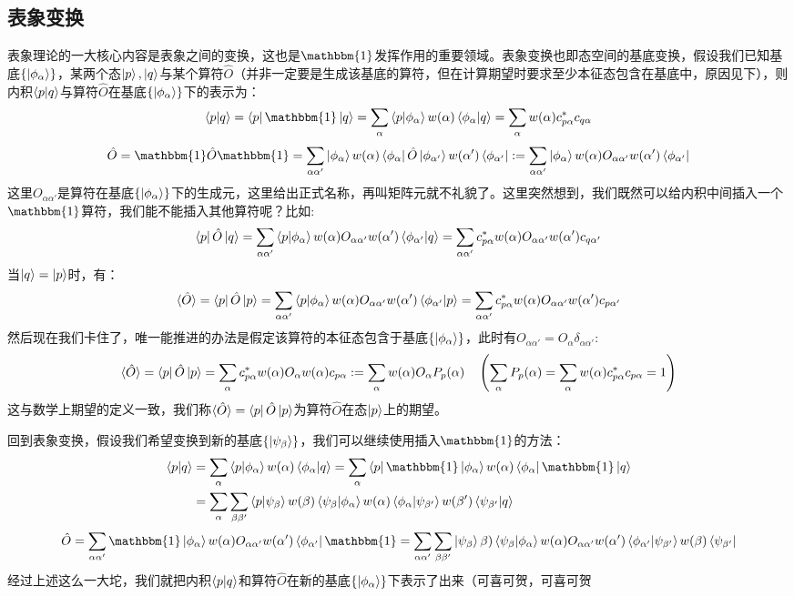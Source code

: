 \subsection{表象变换}
表象理论的一大核心内容是表象之间的变换，这也是$\mathbbm{1}$发挥作用的重要领域。表象变换也即态空间的基底变换，假设我们已知基底$\{\ket{\phi_{\alpha}}\}$，某两个态$\ket{p},\ket{q}$与某个算符$\hat{O}$（并非一定要是生成该基底的算符，但在计算期望时要求至少本征态包含在基底中，原因见下），则内积$\bra{p}\ket{q}$与算符$\hat{O}$在基底$\{\ket{\phi_{\alpha}}\}$下的表示为：
\[\bra{p}\ket{q}=\bra{p}\mathbbm{1}\ket{q}=\sum_{\alpha}\bra{p}\ket{\phi_{\alpha}}w(\alpha)\bra{\phi_{\alpha}}\ket{q}=\sum_{\alpha}w(\alpha)c_{p\alpha}^*c_{q\alpha}\]
\[\hat{O}=\mathbbm{1}\hat{O}\mathbbm{1}=\sum_{\alpha\alpha'}\ket{\phi_{\alpha}}w(\alpha)\bra{\phi_{\alpha}}\hat{O}\ket{\phi_{\alpha'}}w(\alpha')\bra{\phi_{\alpha'}}:=\sum_{\alpha\alpha'}\ket{\phi_{\alpha}}w(\alpha)O_{\alpha\alpha'}w(\alpha')\bra{\phi_{\alpha'}}\]
这里$O_{\alpha\alpha'}$是算符在基底$\{\ket{\phi_{\alpha}}\}$下的生成元，这里给出正式名称，再叫矩阵元就不礼貌了。这里突然想到，我们既然可以给内积中间插入一个$\mathbbm{1}$算符，我们能不能插入其他算符呢？比如:
\[\bra{p}\hat{O}\ket{q}=\sum_{\alpha\alpha'}\bra{p}\ket{\phi_{\alpha}}w(\alpha)O_{\alpha\alpha'}w(\alpha')\bra{\phi_{\alpha'}}\ket{q}=\sum_{\alpha\alpha'}c_{p\alpha}^*w(\alpha)O_{\alpha\alpha'}w(\alpha')c_{q\alpha'}\]
当$\ket{q}=\ket{p}$时，有：
\[\langle\hat{O}\rangle=\bra{p}\hat{O}\ket{p}=\sum_{\alpha\alpha'}\bra{p}\ket{\phi_{\alpha}}w(\alpha)O_{\alpha\alpha'}w(\alpha')\bra{\phi_{\alpha'}}\ket{p}=\sum_{\alpha\alpha'}c_{p\alpha}^*w(\alpha)O_{\alpha\alpha'}w(\alpha')c_{p\alpha'}\]
然后现在我们卡住了，唯一能推进的办法是假定该算符的本征态包含于基底$\{\ket{\phi_{\alpha}}\}$，此时有$O_{\alpha\alpha'}=O_{\alpha}\delta_{\alpha\alpha'}$:
\[\langle\hat{O}\rangle=\bra{p}\hat{O}\ket{p}=\sum_{\alpha}c_{p\alpha}^*w(\alpha)O_{\alpha}w(\alpha)c_{p\alpha}:=\sum_{\alpha}w(\alpha)O_{\alpha}P_p(\alpha) \quad \left(\sum_{\alpha}P_p(\alpha)=\sum_{\alpha}w(\alpha)c_{p\alpha}^*c_{p\alpha}=1\right)\]
这与数学上期望的定义一致，我们称$\langle\hat{O}\rangle=\bra{p}\hat{O}\ket{p}$为算符$\hat{O}$在态$\ket{p}$上的期望。

回到表象变换，假设我们希望变换到新的基底$\{\ket{\psi_{\beta}}\}$，我们可以继续使用插入$\mathbbm{1}$的方法：
\[\begin{aligned}
\bra{p}\ket{q}&=\sum_{\alpha}\bra{p}\ket{\phi_{\alpha}}w(\alpha)\bra{\phi_{\alpha}}\ket{q}=\sum_{\alpha}\bra{p}\mathbbm{1}\ket{\phi_{\alpha}}w(\alpha)\bra{\phi_{\alpha}}\mathbbm{1}\ket{q}\\
&=\sum_{\alpha}\sum_{\beta\beta'}\bra{p}\ket{\psi_{\beta}}w(\beta)\bra{\psi_{\beta}}\ket{\phi_{\alpha}}w(\alpha)\bra{\phi_{\alpha}}\ket{\psi_{\beta'}}w(\beta')\bra{\psi_{\beta'}}\ket{q}
\end{aligned}\]
\[\hat{O}=\sum_{\alpha\alpha'}\mathbbm{1}\ket{\phi_{\alpha}}w(\alpha)O_{\alpha\alpha'}w(\alpha')\bra{\phi_{\alpha'}}\mathbbm{1}=\sum_{\alpha\alpha'}\sum_{\beta\beta'}\ket{\psi_{\beta}}\beta)\bra{\psi_{\beta}}\ket{\phi_{\alpha}}w(\alpha)O_{\alpha\alpha'}w(\alpha')\bra{\phi_{\alpha'}}\ket{\psi_{\beta'}}w(\beta)\bra{\psi_{\beta'}}\]
经过上述这么一大坨，我们就把内积$\bra{p}\ket{q}$和算符$\hat{O}$在新的基底$\{\ket{\phi_{\alpha}}\}$下表示了出来（可喜可贺，可喜可贺

